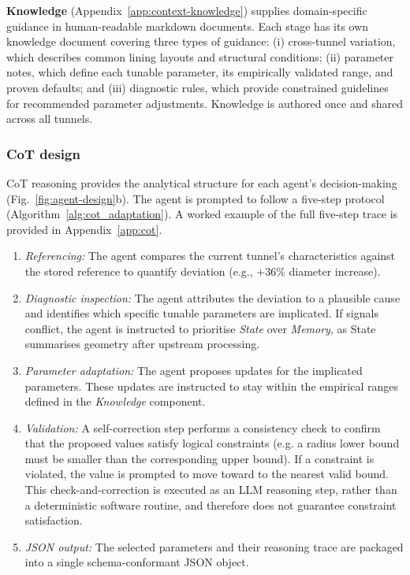 \documentclass[a4paper,fleqn]{cas-dc}
\begin{document}
{\textbf{Knowledge} (Appendix~\ref{app:context-knowledge}) supplies domain-specific guidance in human-readable markdown documents. Each stage has its own knowledge document covering three types of guidance: (i) cross-tunnel variation, which describes common lining layouts and structural conditions; (ii) parameter notes, which define each tunable parameter, its empirically validated range, and proven defaults; and (iii) diagnostic rules, which provide constrained guidelines for recommended parameter adjustments. Knowledge is authored once and shared across all tunnels. 



\subsubsection{CoT design}\label{sec:cot}

CoT reasoning provides the analytical structure for each agent's decision-making (Fig.~\ref{fig:agent-design}b). The agent is prompted to follow a five-step protocol (Algorithm~\ref{alg:cot_adaptation}). A worked example of the full five-step trace is provided in Appendix~\ref{app:cot}.

\begin{enumerate}
    \item \emph{Referencing:} The agent compares the current tunnel's characteristics against the stored reference to quantify deviation (e.g., $+36\%$ diameter increase).
    \item \emph{Diagnostic inspection:} The agent attributes the deviation to a plausible cause and identifies which specific tunable parameters are implicated. If signals conflict, the agent is instructed to prioritise \emph{State} over \emph{Memory}, as State summarises geometry after upstream processing.
    \item \emph{Parameter adaptation:} The agent proposes updates for the implicated parameters. These updates are instructed to stay within the empirical ranges defined in the \emph{Knowledge} component.
    \item \emph{Validation:} A self-correction step performs a consistency check to confirm that the proposed values satisfy logical constraints (e.g. a radius lower bound must be smaller than the corresponding upper bound). If a constraint is violated, the value is prompted to move toward to the nearest valid bound. This check-and-correction is executed as an LLM reasoning step, rather than a deterministic software routine, and therefore does not guarantee constraint satisfaction.
    \item \emph{JSON output:} The selected parameters and their reasoning trace are packaged into a single schema-conformant JSON object.
\end{enumerate}

}
\end{document}
